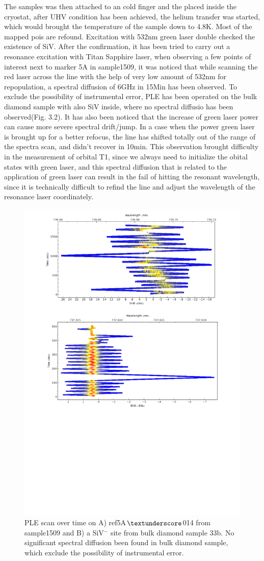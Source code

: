 The samples was then attached to an cold finger and the placed inside the cryostat, after UHV condition has been achieved, the helium transfer was started, which would brought the temperature of the sample down to 4.8K. Most of the mapped pois are refound. Excitation with 532nm green laser double checked the existence of SiV. After the confirmation, it has been tried to carry out a resonance excitation with Titan Sapphire laser, when observing a few points of interest next to marker 5A in sample1509, it was noticed that while scanning the red laser across the line with the help of very low amount of 532nm for repopulation, a spectral diffusion of 6GHz in 15Min has been observed. To exclude the possibility of instrumental error, PLE has been operated on the bulk diamond sample with also SiV inside, where no spectral diffusio has been observed(Fig. 3.2). It has also been noticed that the increase of green laser power can cause more severe spectral drift/jump. In a case when the power green laser is brought up for a better refocus, the line has shifted totally out of the range of the spectra scan, and didn't recover in 10min. This observation brought difficulty in the measurement of orbital T1, since we always need to initialize the obital states with green laser, and this spectral diffusion that is related to the application of green laser can result in the fail of hitting the resonant wavelength, since it is technically difficult to refind the line and adjust the wavelength of the resonance laser coordinately. 

\begin{figure}[h]
\centering
\includegraphics[width=0.7\linewidth]{Figures/pic/PLE}
\caption{PLE scan over time on A) ref5A$\textunderscore$014 from sample1509 and B) a SiV$^{-}$ site from bulk diamond sample 33b. No significant spectral diffusion been found in bulk diamond sample, which exclude the possibility of instrumental error.}
\label{fig:ple}
\end{figure}

